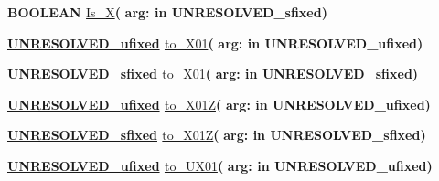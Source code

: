 \begin{DoxyCompactItemize}
\item 
{\bfseries {\bfseries \textcolor{comment}{B\+O\+O\+L\+E\+A\+N}\textcolor{vhdlchar}{ }}} \hyperlink{classfixed__pkg_a636b800ea5efef42745688098f894ad9}{Is\+\_\+\+X}{\bfseries  ( }{\bfseries \textcolor{vhdlchar}{arg\+: }\textcolor{stringliteral}{in }\textcolor{vhdlchar}{U\+N\+R\+E\+S\+O\+L\+V\+E\+D\+\_\+sfixed}}{\bfseries  )} 
\item 
{\bfseries {\bfseries {\bfseries \hyperlink{classfixed__pkg_ae78bc2b36d22f6abeac163955e8a587d}{U\+N\+R\+E\+S\+O\+L\+V\+E\+D\+\_\+ufixed}} \textcolor{vhdlchar}{ }}} \hyperlink{classfixed__pkg_a2f166454c193d6b00c004e6ff7ee9462}{to\+\_\+\+X01}{\bfseries  ( }{\bfseries \textcolor{vhdlchar}{arg\+: }\textcolor{stringliteral}{in }\textcolor{vhdlchar}{U\+N\+R\+E\+S\+O\+L\+V\+E\+D\+\_\+ufixed}}{\bfseries  )} 
\item 
{\bfseries {\bfseries {\bfseries \hyperlink{classfixed__pkg_aa723b28a027c3c0f9bca02d75e8df4d6}{U\+N\+R\+E\+S\+O\+L\+V\+E\+D\+\_\+sfixed}} \textcolor{vhdlchar}{ }}} \hyperlink{classfixed__pkg_ac5b3fb81c3a159b05af4c019c17ac111}{to\+\_\+\+X01}{\bfseries  ( }{\bfseries \textcolor{vhdlchar}{arg\+: }\textcolor{stringliteral}{in }\textcolor{vhdlchar}{U\+N\+R\+E\+S\+O\+L\+V\+E\+D\+\_\+sfixed}}{\bfseries  )} 
\item 
{\bfseries {\bfseries {\bfseries \hyperlink{classfixed__pkg_ae78bc2b36d22f6abeac163955e8a587d}{U\+N\+R\+E\+S\+O\+L\+V\+E\+D\+\_\+ufixed}} \textcolor{vhdlchar}{ }}} \hyperlink{classfixed__pkg_aef44a8bc5f5256e578cc54a156494499}{to\+\_\+\+X01\+Z}{\bfseries  ( }{\bfseries \textcolor{vhdlchar}{arg\+: }\textcolor{stringliteral}{in }\textcolor{vhdlchar}{U\+N\+R\+E\+S\+O\+L\+V\+E\+D\+\_\+ufixed}}{\bfseries  )} 
\item 
{\bfseries {\bfseries {\bfseries \hyperlink{classfixed__pkg_aa723b28a027c3c0f9bca02d75e8df4d6}{U\+N\+R\+E\+S\+O\+L\+V\+E\+D\+\_\+sfixed}} \textcolor{vhdlchar}{ }}} \hyperlink{classfixed__pkg_a3ed6719b346c7599520f0eaf0f005525}{to\+\_\+\+X01\+Z}{\bfseries  ( }{\bfseries \textcolor{vhdlchar}{arg\+: }\textcolor{stringliteral}{in }\textcolor{vhdlchar}{U\+N\+R\+E\+S\+O\+L\+V\+E\+D\+\_\+sfixed}}{\bfseries  )} 
\item 
{\bfseries {\bfseries {\bfseries \hyperlink{classfixed__pkg_ae78bc2b36d22f6abeac163955e8a587d}{U\+N\+R\+E\+S\+O\+L\+V\+E\+D\+\_\+ufixed}} \textcolor{vhdlchar}{ }}} \hyperlink{classfixed__pkg_a4c74d55f161d5cab4f0967e9b2412169}{to\+\_\+\+U\+X01}{\bfseries  ( }{\bfseries \textcolor{vhdlchar}{arg\+: }\textcolor{stringliteral}{in }\textcolor{vhdlchar}{U\+N\+R\+E\+S\+O\+L\+V\+E\+D\+\_\+ufixed}}{\bfseries  )} 

\end{DoxyCompactItemize}
